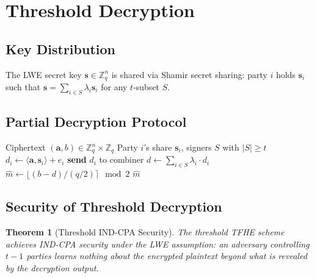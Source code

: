 \documentclass[11pt,a4paper]{article}
\newtheorem{theorem}{Theorem}[section]
\begin{document}
\section{Threshold Decryption}
\label{sec:threshold}

\subsection{Key Distribution}

The LWE secret key $\mathbf{s} \in \mathbb{Z}_q^n$ is shared via Shamir secret sharing:
party $i$ holds $\mathbf{s}_i$ such that $\mathbf{s} = \sum_{i \in S} \lambda_i \mathbf{s}_i$
for any $t$-subset $S$.

\subsection{Partial Decryption Protocol}

\begin{algorithm}[H]
\caption{Threshold TFHE Decryption}
\label{alg:threshold-decrypt}
\begin{algorithmic}[1]
\Require Ciphertext $(\mathbf{a}, b) \in \mathbb{Z}_q^n \times \mathbb{Z}_q$
\Require Party $i$'s share $\mathbf{s}_i$, signers $S$ with $|S| \geq t$
\State {}
\State $d_i \gets \langle \mathbf{a}, \mathbf{s}_i \rangle + e_i$ 
\State \textbf{send} $d_i$ to combiner
\State {}
\State $d \gets \sum_{i \in S} \lambda_i \cdot d_i$ 
\State $\hat{m} \gets \lfloor (b - d) / (q/2) \rceil \mod 2$
\State \Return $\hat{m}$
\end{algorithmic}
\end{algorithm}

\subsection{Security of Threshold Decryption}

\begin{theorem}[Threshold IND-CPA Security]
\label{thm:threshold-security}
The threshold TFHE scheme achieves IND-CPA security under the LWE assumption: an
adversary controlling $t-1$ parties learns nothing about the encrypted plaintext
beyond what is revealed by the decryption output.
\end{theorem}
\end{document}
